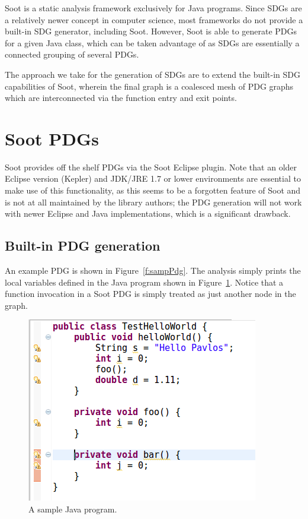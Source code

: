 \documentclass[authoryear,preprint]{sigplanconf}
\begin{document}
Soot is a static analysis framework exclusively for Java programs. Since SDGs are a relatively newer concept in computer science, most frameworks do not provide a built-in SDG generator, including Soot. However, Soot is able to generate PDGs for a given Java class, which can be taken advantage of as SDGs are essentially a connected grouping of several PDGs.

The approach we take for the generation of SDGs are to extend the built-in SDG capabilities of Soot, wherein the final graph is a coalesced mesh of PDG graphs which are interconnected via the function entry and exit points.

\section{Soot PDGs}
\label{sec:some_section}

Soot provides off the shelf PDGs via the Soot Eclipse plugin. Note that an older Eclipse version (Kepler) and JDK/JRE 1.7 or lower environments are essential to make use of this functionality, as this seems to be a forgotten feature of Soot and is not at all maintained by the library authors; the PDG generation will not work with newer Eclipse and Java implementations, which is a significant drawback.

\subsection{Built-in PDG generation}

An example PDG is shown in Figure~\ref{f:sampPdg}. The analysis simply prints the local variables defined in the Java program shown in Figure~\ref{f:sampProg}. Notice that a function invocation in a Soot PDG is simply treated as just another node in the graph.

\begin{figure}[ht]
	\centering
	\includegraphics[width=.6\linewidth]{figures/Selection_078}
	\caption[A sample Java program]{\label{f:sampProg}A sample Java program.}
\end{figure}
\end{document}
